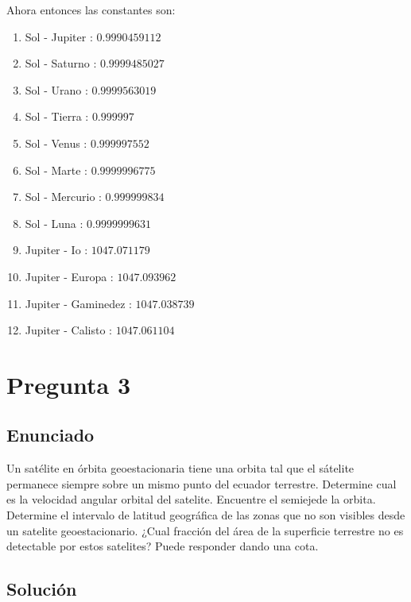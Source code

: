\documentclass[12pt]{article}
\begin{document}
\begin{enumerate}
   Ahora entonces las constantes son:
   \begin{enumerate}
     \item Sol - Jupiter : $0.9990459112$ 
     \item Sol - Saturno : $0.9999485027$ 
     \item Sol - Urano : $0.9999563019$ 
     \item Sol - Tierra : $0.999997$ 
     \item Sol - Venus : $0.999997552$ 
     \item Sol - Marte : $0.9999996775$ 
     \item Sol - Mercurio : $0.999999834$ 
     \item Sol - Luna : $0.9999999631$ 
     \item Jupiter - Io : $1047.071179$ 
     \item Jupiter - Europa : $1047.093962$ 
     \item Jupiter - Gaminedez : $1047.038739$ 
     \item Jupiter - Calisto : $1047.061104$
   \end{enumerate}
\end{enumerate}

\section*{Pregunta 3}

\subsection*{Enunciado}

Un satélite en órbita geoestacionaria tiene una orbita tal que el sátelite permanece siempre sobre un mismo punto del ecuador terrestre. Determine cual es la velocidad angular orbital del satelite. Encuentre el semiejede la orbita. Determine el intervalo de latitud geográfica de las zonas que no son visibles desde un satelite geoestacionario. ¿Cual fracción del área de la superficie terrestre no es detectable por estos satelites? Puede responder dando una cota.

\subsection*{Solución}
\end{document}
